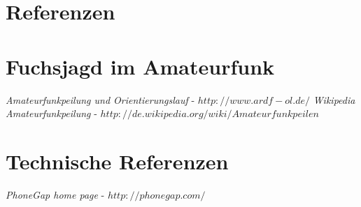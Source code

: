 
\newpage
\section{Referenzen} %
\label{sec:referenzen}

\begin{thebibliography}{breitestes Label}

\section*{Fuchsjagd im Amateurfunk}
    \textit{Amateurfunkpeilung und Orientierungslauf} - $http://www.ardf-ol.de/$
    \textit{Wikipedia Amateurfunkpeilung} - $http://de.wikipedia.org/wiki/Amateurfunkpeilen$
\section*{Technische Referenzen} 
    \textit{PhoneGap home page} - $http://phonegap.com/$

\end{thebibliography}

